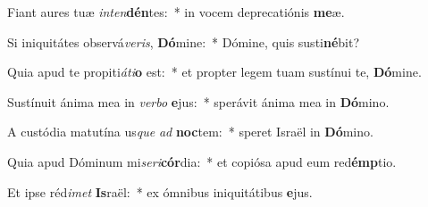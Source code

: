 \item Fiant aures tuæ \textit{in}\textit{ten}\textbf{dén}tes:~* in vocem deprecatiónis \textbf{me}æ.
\item Si iniquitátes observá\textit{ve}\textit{ris}, \textbf{Dó}mine:~* Dómine, quis susti\textbf{né}bit?
\item Quia apud te propiti\textit{á}\textit{ti}\textbf{o} est:~* et propter legem tuam sustínui te, \textbf{Dó}mine.
\item Sustínuit ánima mea in \textit{ver}\textit{bo} \textbf{e}jus:~* sperávit ánima mea in \textbf{Dó}mino.
\item A custódia matutína us\textit{que} \textit{ad} \textbf{noc}tem:~* speret Israël in \textbf{Dó}mino.
\item Quia apud Dóminum mi\textit{se}\textit{ri}\textbf{cór}dia:~* et copiósa apud eum red\textbf{émp}tio.
\item Et ipse réd\textit{i}\textit{met} \textbf{Is}raël:~* ex ómnibus iniquitátibus \textbf{e}jus.
